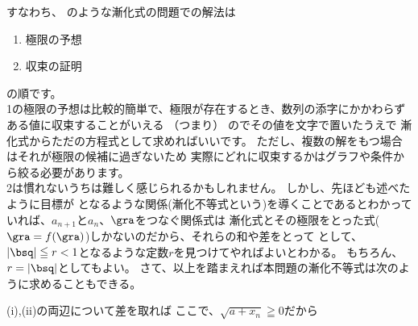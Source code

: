 \documentclass[a4paper]{ltjsarticle}
\begin{document}
\begin{enumerate}[label=\arabic*.]
\begin{supple*}
      すなわち、
      のような漸化式の問題での解法は
      \begin{enumerate}[label=\arabic*.]
        \item 極限の予想
        \item 収束の証明
      \end{enumerate}
      の順です。\\
      1の極限の予想は比較的簡単で、極限が存在するとき、数列の添字にかかわらずある値に収束することがいえる
      （つまり）
      のでその値を文字で置いたうえで
      漸化式からただの方程式として求めればいいです。
      ただし、複数の解をもつ場合はそれが極限の候補に過ぎないため
      実際にどれに収束するかはグラフや条件から絞る必要があります。 \\
      2は慣れないうちは難しく感じられるかもしれません。
      しかし、先ほども述べたように目標が
      となるような関係(漸化不等式という)を導くことであるとわかっていれば、$a_{n+1}$と$a_n$、$\gra$をつなぐ関係式は
      漸化式とその極限をとった式($\gra = f(\gra)$)しかないのだから、それらの和や差をとって
      として、$|\bsq| \leqq r < 1$となるような定数$r$を見つけてやればよいとわかる。
      もちろん、$r = |\bsq|$としてもよい。
      \baselineskip
      さて、以上を踏まえれば本問題の漸化不等式は次のように求めることもできる。\\
      \begin{other*}
        (i),(ii)の両辺について差を取れば
        ここで、$\sqrt{a + x_n}\geqq 0$だから
      \end{other*}
    \end{supple*}
  \end{enumerate}
\end{document}
